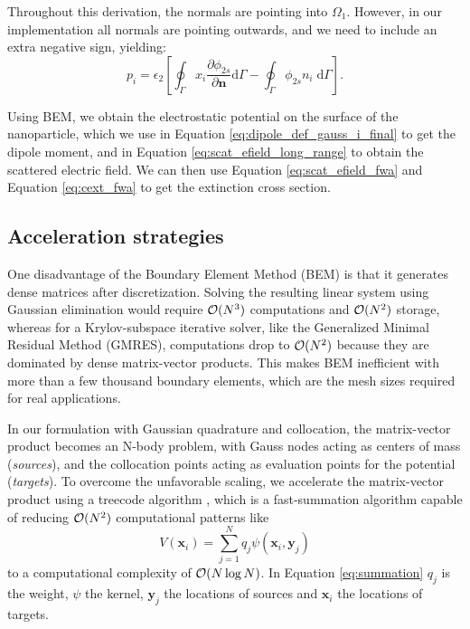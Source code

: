 %
Throughout this derivation, the normals are pointing into $\Omega_1$. However, in our implementation 
all normals are pointing outwards, and we need to include an extra negative sign, yielding:
%
\begin{equation} \label{eq:dipole_def_gauss_i_final}
{p_i} = \epsilon_2 \left[ \oint_\Gamma  x_i  \frac{\partial \phi_{2s}}{\partial \mathbf{n}} \text{d}\Gamma - \oint_\Gamma \phi_{2s} n_i \; \text{d}\Gamma \right].
\end{equation}

Using BEM, we obtain the electrostatic potential on the surface of the nanoparticle, 
which we use in Equation \eqref{eq:dipole_def_gauss_i_final} to get the dipole 
moment, and in Equation \eqref{eq:scat_efield_long_range} to obtain the scattered
electric field. We can then use Equation \eqref{eq:scat_efield_fwa} and Equation 
\eqref{eq:cext_fwa} to get the extinction cross section.

\subsection{Acceleration strategies} \label{sec:acc_strategies}

One disadvantage of the Boundary Element Method (BEM) is that it generates dense matrices
after discretization. Solving the resulting linear system using
Gaussian elimination would require $\mathcal{O}(N^3)$ computations and $\mathcal{O}(N^2)$ storage, whereas for a
Krylov-subspace iterative solver, like the Generalized Minimal Residual Method (GMRES),
computations drop to $\mathcal{O}(N^2)$ because they are dominated by dense matrix-vector 
products. This makes BEM inefficient with more than a few thousand boundary elements,
which are the mesh sizes required for real applications. 

In our formulation with Gaussian quadrature and collocation, the matrix-vector product
becomes an N-body problem, with Gauss nodes acting as centers of mass (\emph{sources}), 
and the collocation points acting as evaluation points for the potential (\emph{targets}).
To overcome the unfavorable scaling,
we accelerate the matrix-vector product using a treecode algorithm \cite{BarnesHut1986,DuanKrasny2001}, 
which is a fast-summation algorithm capable of reducing $\mathcal{O}(N^2)$
computational patterns like
%
\begin{equation} \label{eq:summation}
V(\mathbf{x}_i) = \sum_{j=1}^{N} q_j \psi(\mathbf{x}_i, \mathbf{y}_j) 
\end{equation}
%
\noindent to a computational complexity of $\mathcal{O}(N \log N)$. In Equation \eqref{eq:summation} 
$q_j$ is the weight, $\psi$ the kernel, $\mathbf{y}_j$ the locations of sources and 
$\mathbf{x}_i$ the locations of targets.

